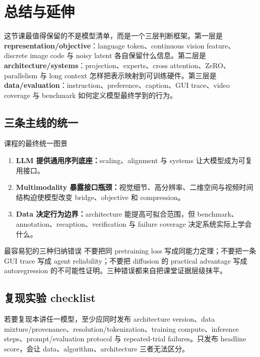 \section{总结与延伸}

这节课最值得保留的不是模型清单，而是一个三层判断框架。第一层是 \textbf{representation/objective}：language token、continuous vision feature、discrete image code 与 noisy latent 各自保留什么信息。第二层是 \textbf{architecture/systems}：projection、experts、cross attention、ZeRO、parallelism 与 long context 怎样把表示映射到可训练硬件。第三层是 \textbf{data/evaluation}：instruction、preference、caption、GUI trace、video coverage 与 benchmark 如何定义模型最终学到的行为。

\subsection{三条主线的统一}

\begin{importantbox}{课程的最终统一图景}
\begin{enumerate}
  \item \textbf{LLM 提供通用序列底座：}scaling、alignment 与 systems 让大模型成为可复用接口。
  \item \textbf{Multimodality 暴露接口瓶颈：}视觉细节、高分辨率、二维空间与视频时间结构迫使模型改变 bridge、objective 和 compression。
  \item \textbf{Data 决定行为边界：}architecture 能提高可拟合范围，但 benchmark、annotation、recaption、verification 与 failure coverage 决定系统实际上学会什么。
\end{enumerate}
\end{importantbox}

\begin{warningbox}{最容易犯的三种归纳错误}
不要把同 pretraining loss 写成同能力定理；不要把一条 GUI trace 写成 agent reliability；不要把 diffusion 的 practical advantage 写成 autoregression 的不可能性证明。三种错误都来自把课堂证据层级抹平。
\end{warningbox}

\subsection{复现实验 checklist}

若要复现本讲任一模型，至少应同时发布 architecture version、data mixture/provenance、resolution/tokenization、training compute、inference steps、prompt/evaluation protocol 与 repeated-trial failures。只发布 headline score，会让 data、algorithm、architecture 三者无法区分。

